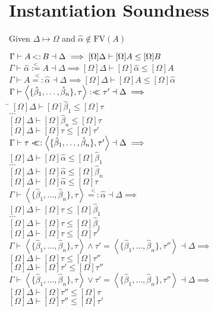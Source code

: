 \documentclass{article}
\newcommand{\st}{\ensuremath{\hspace{-1px}<:\hspace{-1px}}}
\newcommand{\alphahat}{\hat{\alpha}}
\newcommand{\betahat}{\hat{\beta}}
\newcommand{\lub}{\ensuremath{\vee}}
\newcommand{\glb}{\ensuremath{\wedge}}
\newcommand{\instr}{\overset{<}{=:}}
\newcommand{\instl}{\overset{<}{:=}}
\newcommand{\sigbndl}{:<\hspace{-5px}<}
\newcommand{\sigbndr}{<\hspace{-5px}<:}
\newcommand{\siginstr}{\overset{\overline{<}}{=:}}
\newcounter{labctr}
\newcommand{\resla}{\setcounter{labctr}{0}}
\newcommand{\pair}[2]{\left<#1,#2\right>}
\begin{document}
\section{Instantiation Soundness}
\resla
Given $\Delta \mapsto \Omega$ and $\alphahat\not\in\text{FV}(A)$
\begin{tabbing}
$\Gamma \vdash A \st B \dashv \Delta \implies [\Omega]\Delta \vdash [\Omega]A \leq [\Omega]B$\\
$\Gamma \vdash \alphahat \instl A \dashv \Delta \implies [\Omega]\Delta \vdash [\Omega]\alphahat \leq [\Omega]A$\\
$\Gamma \vdash  A \instr \alphahat \dashv \Delta \implies [\Omega]\Delta \vdash [\Omega]A \leq [\Omega]\alphahat$\\
$\Gamma \vdash \pair{\{\betahat_1,\ldots,\betahat_n\}}{\tau} \sigbndl \tau' \dashv \Delta \implies$\\
\hspace{1em}\= $[\Omega]\Delta \vdash [\Omega]\betahat_1 \leq [\Omega]\tau$\\
\> $\ldots$\\
\> $[\Omega]\Delta \vdash [\Omega]\betahat_n \leq [\Omega]\tau$\\
\> $[\Omega]\Delta \vdash [\Omega]\tau \leq [\Omega]\tau'$\\
$\Gamma \vdash \tau \sigbndr \pair{\{\betahat_1,\ldots,\betahat_n\}}{\tau'} \dashv \Delta \implies$\\
\> $[\Omega]\Delta \vdash [\Omega]\alphahat \leq [\Omega]\betahat_1$\\
\> $\ldots$\\
\> $[\Omega]\Delta \vdash [\Omega]\alphahat \leq [\Omega]\betahat_n$\\
\> $[\Omega]\Delta \vdash [\Omega]\alphahat \leq [\Omega]\tau$\\
$\Gamma \vdash \pair{\{\betahat_1,\ldots,\betahat_n\}}{\tau} \siginstr \alphahat \dashv \Delta \implies$\\
\> $[\Omega]\Delta \vdash [\Omega]\tau \leq [\Omega]\betahat_1$\\
\> $\ldots$\\
\> $[\Omega]\Delta \vdash [\Omega]\tau \leq [\Omega]\betahat_1$\\
\> $[\Omega]\Delta \vdash [\Omega]\tau \leq [\Omega]\tau'$\\
$\Gamma \vdash \pair{\{\betahat_1,\ldots,\betahat_n\}}{\tau} \glb \tau' = \pair{\{\betahat_1,\ldots,\betahat_n\}}{\tau''} \dashv \Delta \implies$\\
\> $[\Omega]\Delta \vdash [\Omega]\tau \leq [\Omega]\tau''$\\
\> $[\Omega]\Delta \vdash [\Omega]\tau' \leq [\Omega]\tau''$\\
$\Gamma \vdash \pair{\{\betahat_1,\ldots,\betahat_n\}}{\tau} \lub \tau' = \pair{\{\betahat_1,\ldots,\betahat_n\}}{\tau''} \dashv \Delta \implies$\\
\> $[\Omega]\Delta \vdash [\Omega]\tau'' \leq [\Omega]\tau$\\
\> $[\Omega]\Delta \vdash [\Omega]\tau'' \leq [\Omega]\tau'$\\
\end{tabbing}
\end{document}

